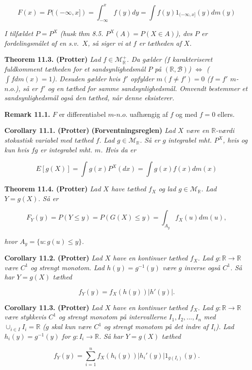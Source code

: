 \documentclass[
]{book}
\begin{document}
\[
F(x)=P((-\infty,x])=\int_{-\infty}^x f(y)dy=\int f(y)1_{(-\infty,x]}(y)dm(y)
\]

\emph{I tilfældet \(P=P^X\) (husk thm 8.5. \(P^X(A)=P(X\in A)\)), dvs \(P\) er fordelingsmålet af en s.v.~\(X\), så siger vi at \(f\) er tætheden af \(X\).}

\textbf{Theorem 11.3. (Protter)} \emph{Lad \(f\in \mathcal{M}_{\mathbb{R}}^+\). Da gælder (\(f\) karakteriseret fuldkomment tætheden for et sandsynlighedsmål \(P\) på \((\mathbb{R},\mathcal{B})\)) \(\Longleftrightarrow\) (\(\int f dm(x)=1\)). Desuden gælder hvis \(f'\) opfylder \(m(f\ne f')=0\) (\(f=f'\) \(m\)-\(n.o.\)), så er \(f'\) og en tæthed for samme sandsynlighedsmål. Omvendt bestemmer et sandsynlighedsmål også den tæthed, når denne eksisterer.}

\textbf{Remark 11.1.} \(F\) er differentiabel \(m\)-\(n.o.\) uafhængig af \(f\) og med \(f=0\) ellers.

\textbf{Corollary 11.1. (Protter)} \textbf{(Forventningsreglen)} \emph{Lad \(X\) være en \(\mathbb{R}\)-værdi stokastisk variabel med tæthed \(f\). Lad \(g\in\mathcal{M}_{\mathbb{R}}\). Så er \(g\) integrabel mht. \(P^X\), hvis og kun hvis \(fg\) er integrabel mht. \(m\). Hvis da er}

\[
E[g(X)]=\int g(x)P^X(dx)=\int g(x)f(x) dm(x)
\]

\textbf{Theorem 11.4. (Protter)} \emph{Lad \(X\) have tæthed \(f_X\) og lad \(g\in\mathcal{M}_{\mathbb{R}}\). Lad \(Y=g(X)\). Så er}

\[
F_Y(y)=P(Y\le y)=P(G(X)\le y)=\int_{A_y} f_X(u)dm(u),
\]

\emph{hvor \(A_y=\{u : g(u)\le y\}\).}

\textbf{Corollary 11.2. (Protter)} \emph{Lad \(X\) have en kontinuer tæthed \(f_X\). Lad \(g: \mathbb{R}\to \mathbb{R}\) være \(C^1\) og strengt monotom. Lad \(h(y)=g^{-1}(y)\) være \(g\) inverse også \(C^1\). Så har \(Y=g(X)\) tæthed}

\[
f_Y(y)=f_X(h(y))|h'(y)|.
\]

\textbf{Corollary 11.3. (Protter)} \emph{Lad \(X\) have en kontinuer tæthed \(f_X\). Lad \(g: \mathbb{R}\to \mathbb{R}\) være stykkevis \(C^1\) og strengt monotom på intervallerne \(I_1,I_2,...,I_n\) med \(\cup_{i\in I}I_i=\mathbb{R}\) (\(g\) skal kun være \(C^1\) og strengt monotom på det indre af \(I_i\)). Lad \(h_i(y)=g^{-1}(y)\) for \(g: I_i\to \mathbb{R}\). Så har \(Y=g(X)\) tæthed}

\[
f_Y(y)=\sum_{i=1}^n f_X(h_i(y))|h_i'(y)| 1_{g(I_i)}(y).
\]
\end{document}
